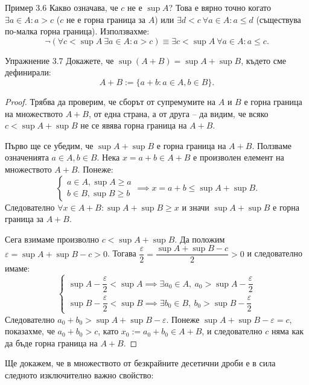 \begin{problembox}{Пример 3.6}
Какво означава, че $c$ не е $\sup A$? Това е вярно точно когато $\exists a \in A : a > c$ ($c$ не е горна граница за $A$) или $\exists d < c \ \forall a \in A : a \le d$ (съществува по-малка горна граница). Използвахме:
\[
\neg (\forall c < \sup A \ \exists a \in A : a > c) \equiv \exists c < \sup A \ \forall a \in A : a \le c.
\]
\end{problembox}

\begin{problembox}{Упражнение 3.7}
Докажете, че $\sup (A + B) = \sup A + \sup B$, където сме дефинирали:
\[
A + B := \{a + b : a \in A, b \in B\}.
\]
\end{problembox}

\begin{proof}
Трябва да проверим, че сборът от супремумите на $A$ и $B$ е горна граница на множеството $A + B$, от една страна, а от друга -- да видим, че всяко $c < \sup A + \sup B$ не се явява горна граница на $A + B$.

Първо ще се убедим, че $\sup A + \sup B$ е горна граница на $A + B$. Ползваме означенията $a \in A, b \in B$. Нека $x = a + b \in A + B$ е произволен елемент на множеството $A + B$. Понеже:
\[
\begin{cases}
a \in A, \sup A \ge a \\
b \in B, \sup B \ge b
\end{cases}
\implies x = a + b \le \sup A + \sup B.
\]
Следователно $\forall x \in A + B : \sup A + \sup B \ge x$ и значи $\sup A + \sup B$ е горна граница за $A + B$.

Сега взимаме произволно $c < \sup A + \sup B$. Да положим $\varepsilon = \sup A + \sup B - c > 0$. Тогава $\dfrac{\varepsilon}{2} = \dfrac{\sup A + \sup B - c}{2} > 0$ и следователно имаме:
\[
\begin{cases}
\sup A - \dfrac{\varepsilon}{2} < \sup A \implies \exists a_0 \in A, \ a_0 > \sup A - \dfrac{\varepsilon}{2} \\[2mm]
\sup B - \dfrac{\varepsilon}{2} < \sup B \implies \exists b_0 \in B, \ b_0 > \sup B - \dfrac{\varepsilon}{2}
\end{cases}
\]
Следователно $a_0 + b_0 > \sup A + \sup B - \varepsilon$. Понеже $\sup A + \sup B - \varepsilon = c$, показахме, че $a_0 + b_0 > c$, като $x_0 := a_0 + b_0 \in A + B$, и следователно $c$ няма как да бъде горна граница на $A + B$.
\end{proof}

Ще докажем, че в множеството от безкрайните десетични дроби е в сила следното изключително важно свойство:

